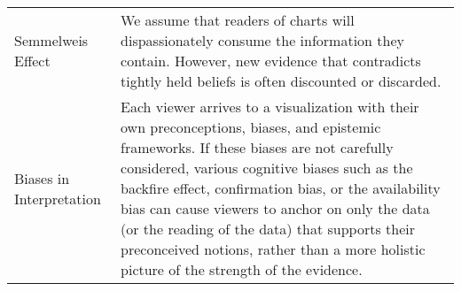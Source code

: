 \begin{longtable}{p{3cm}p{14cm}}
 \rowcolor{colord-opaque}Semmelweis Effect & We assume that readers of charts will dispassionately consume the information they contain. However, new evidence that contradicts tightly held beliefs is often discounted or discarded. \cite{valdez2017framework}\\
 \rowcolor{colord}Biases in \newline Interpretation & Each viewer arrives to a visualization with their own preconceptions, biases, and epistemic frameworks. If these biases are not carefully considered, various cognitive biases such as the backfire effect, confirmation bias, or the availability bias can cause viewers to anchor on only the data (or the reading of the data) that supports their preconceived notions, rather than a more holistic picture of the strength of the evidence. \cite{dignazio2019draft, d2016feminist,valdez2017framework, few2019loom,wall2017warning}\\
\end{longtable}
\label{table:mirage-table}
